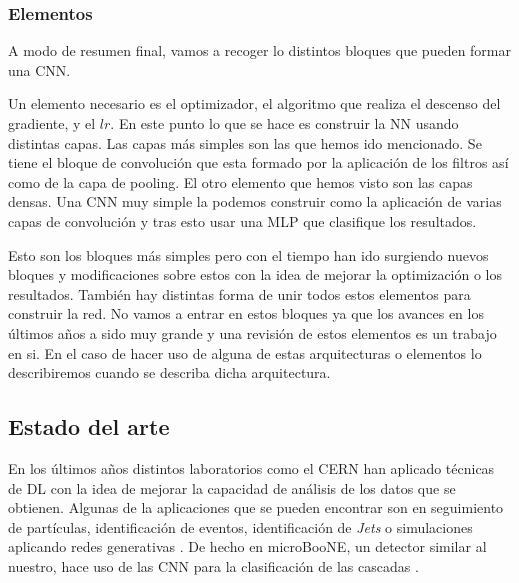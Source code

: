 \documentclass[a4paper,12pt,twoside,titlepage]{article}
\begin{document}
\subsubsection*{Elementos}

A modo de resumen final, vamos a recoger lo distintos bloques que pueden formar una CNN.

Un elemento necesario es el optimizador, el algoritmo que realiza el descenso del gradiente, y el $lr$. En este punto lo que se hace es construir la NN usando distintas capas. Las capas más simples son las que hemos ido mencionado. Se tiene el bloque de convolución que esta formado por la aplicación de los filtros así como de la capa de pooling. El otro elemento que hemos visto son las capas densas. Una CNN muy simple la podemos construir como la aplicación de varias capas de convolución y tras esto usar una MLP que clasifique los resultados.

Esto son los bloques más simples pero con el tiempo han ido surgiendo nuevos bloques y modificaciones sobre estos con la idea de mejorar la optimización o los resultados. También hay distintas forma de unir todos estos elementos para construir la red. No vamos a entrar en estos bloques ya que los avances en los últimos años a sido muy grande y una revisión de estos elementos es un trabajo en si. En el caso de hacer uso de alguna de estas arquitecturas o elementos lo describiremos cuando se describa dicha arquitectura.

\subsection{Estado del arte}

En los últimos años distintos laboratorios como el CERN han aplicado técnicas de DL \cite{ml_phy} con la idea de mejorar la capacidad de análisis de los datos que se obtienen. Algunas de la aplicaciones que se pueden encontrar son en seguimiento de partículas, identificación de eventos, identificación de \textit{Jets} o simulaciones aplicando redes generativas \cite{dl_phy, dl_lhc}. De hecho en microBooNE, un detector similar al nuestro, hace uso de las CNN para la clasificación de las cascadas \cite{ml_phy}.
\end{document}
